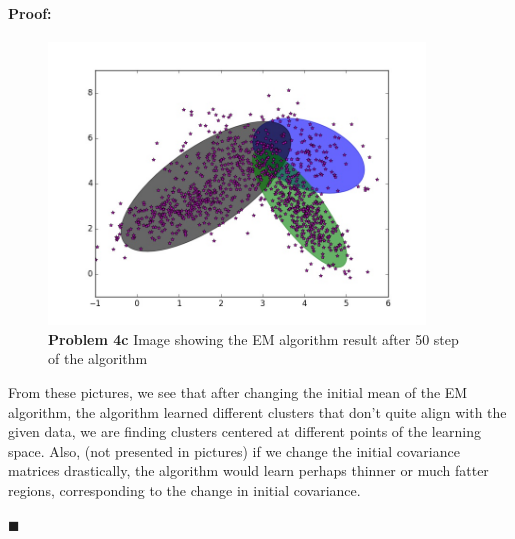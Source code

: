 \documentclass[12pt]{article}
\newenvironment{proof}{\paragraph{Proof: }}{\hfill$\blacksquare$}
\begin{document}
\begin{proof}
\begin{enumerate}
\begin{figure}[!htbp]
\centering
\includegraphics[width = 10cm]{prob4c_50_random_2.jpg}
\caption{\textbf{Problem 4c} Image showing the EM algorithm result after 50 step of the algorithm}
\end{figure}

From these pictures, we see that after changing the initial mean of the EM algorithm, the algorithm learned different clusters that don't quite align with the given data, we are finding clusters centered at different points of the learning space. Also, (not presented in pictures) if we change the initial covariance matrices drastically, the algorithm would learn perhaps thinner or much fatter regions, corresponding to the change in initial covariance.

\end{enumerate}

\end{proof}
\end{document}
